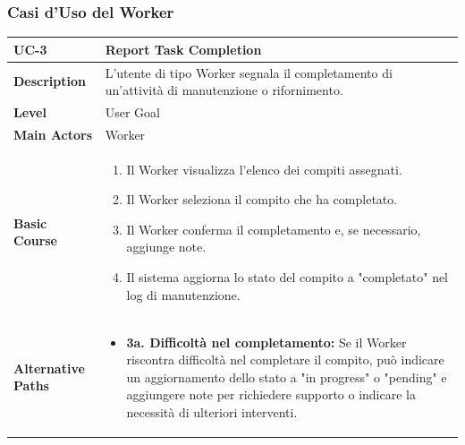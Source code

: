 \subsubsection{Casi d'Uso del Worker}
\begin{table}[H]
\centering
\begin{tabularx}{\textwidth}{|p{2.5cm}|X|}
\hline
\textbf{UC-3} & \textbf{Report Task Completion} \\
\hline
\textbf{Description} & L'utente di tipo Worker segnala il completamento di un'attività di manutenzione o rifornimento. \\
\hline
\textbf{Level} & User Goal \\
\hline
\textbf{Main Actors} & Worker \\
\hline
\textbf{Basic Course} &
\begin{enumerate}
    \item Il Worker visualizza l'elenco dei compiti assegnati.
    \item Il Worker seleziona il compito che ha completato.
    \item Il Worker conferma il completamento e, se necessario, aggiunge note.
    \item Il sistema aggiorna lo stato del compito a "completato" nel log di manutenzione.
\end{enumerate} \\
\hline
\textbf{Alternative Paths} &
\begin{itemize}
    \item \textbf{3a. Difficoltà nel completamento:} Se il Worker riscontra difficoltà nel completare il compito, può indicare un aggiornamento dello stato a "in progress" o "pending" e aggiungere note per richiedere supporto o indicare la necessità di ulteriori interventi.
\end{itemize} \\
\hline
\end{tabularx}
\end{table}

